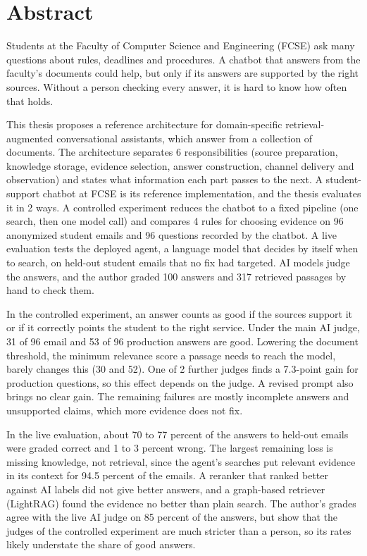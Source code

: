 \section*{Abstract}

Students at the Faculty of Computer Science and Engineering (FCSE) ask many questions about rules, deadlines and procedures. A chatbot that answers from the faculty's documents could help, but only if its answers are supported by the right sources. Without a person checking every answer, it is hard to know how often that holds.

This thesis proposes a reference architecture for domain-specific retrieval-augmented conversational assistants, which answer from a collection of documents. The architecture separates 6 responsibilities (source preparation, knowledge storage, evidence selection, answer construction, channel delivery and observation) and states what information each part passes to the next. A student-support chatbot at FCSE is its reference implementation, and the thesis evaluates it in 2 ways. A controlled experiment reduces the chatbot to a fixed pipeline (one search, then one model call) and compares 4 rules for choosing evidence on 96 anonymized student emails and 96 questions recorded by the chatbot. A live evaluation tests the deployed agent, a language model that decides by itself when to search, on held-out student emails that no fix had targeted. AI models judge the answers, and the author graded 100 answers and 317 retrieved passages by hand to check them.

In the controlled experiment, an answer counts as good if the sources support it or if it correctly points the student to the right service. Under the main AI judge, 31 of 96 email and 53 of 96 production answers are good. Lowering the document threshold, the minimum relevance score a passage needs to reach the model, barely changes this (30 and 52). One of 2 further judges finds a 7.3-point gain for production questions, so this effect depends on the judge. A revised prompt also brings no clear gain. The remaining failures are mostly incomplete answers and unsupported claims, which more evidence does not fix.

In the live evaluation, about 70 to 77 percent of the answers to held-out emails were graded correct and 1 to 3 percent wrong. The largest remaining loss is missing knowledge, not retrieval, since the agent's searches put relevant evidence in its context for 94.5 percent of the emails. A reranker that ranked better against AI labels did not give better answers, and a graph-based retriever (LightRAG) found the evidence no better than plain search. The author's grades agree with the live AI judge on 85 percent of the answers, but show that the judges of the controlled experiment are much stricter than a person, so its rates likely understate the share of good answers.


